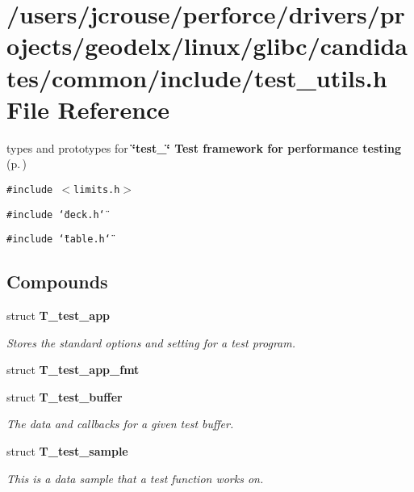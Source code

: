 \section{/users/jcrouse/perforce/drivers/projects/geodelx/linux/glibc/candidates/common/include/test\_\-utils.h File Reference}
\label{test__utils_8h}
types and prototypes for {\bf \char`\"{}test\_\-\char`\"{} Test framework for performance testing} {\rm (p.\,\pageref{group__test})} 


{\tt \#include $<$limits.h$>$}\par
{\tt \#include \char`\"{}deck.h\char`\"{}}\par
{\tt \#include \char`\"{}table.h\char`\"{}}\par
\subsection*{Compounds}
\begin{CompactItemize}
\item 
struct {\bf T\_\-test\_\-app}
\begin{CompactList}\small\item\em Stores the standard options and setting for a test program.\item\end{CompactList}\item 
struct {\bf T\_\-test\_\-app\_\-fmt}
\item 
struct {\bf T\_\-test\_\-buffer}
\begin{CompactList}\small\item\em The data and callbacks for a given test buffer.\item\end{CompactList}\item 
struct {\bf T\_\-test\_\-sample}
\begin{CompactList}\small\item\em This is a data sample that a test function works on.\item\end{CompactList}\end{CompactItemize}
